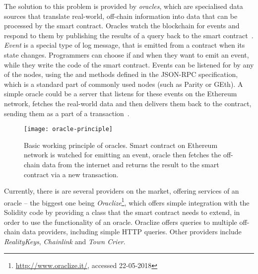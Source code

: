 The solution to this problem is provided by \textit{oracles}, which are specialised data sources that translate real-world, off-chain information into data that can be processed by the smart contract. Oracles watch the blockchain for events and respond to them by publishing the results of a query back to the smart contract~\cite{JohnWeldon2016BuildingContract}. \textit{Event} is a special type of log message, that is emitted from a contract when its state changes. Programmers can choose if and when they want to emit an event, while they write the code of the smart contract. Events can be listened for by any of the nodes, using the  and  methods defined in the JSON-RPC specification\footnotemark, which is a standard part of commonly used nodes (such as Parity or GEth). A simple oracle could be a server that listens for these events on the Ethereum network, fetches the real-world data and then delivers them back to the contract, sending them as a part of a transaction~\cite{JulesDourlens2017Oracles:Blockchain, 2018OraclizeDocumentation}. 
% 
% 
\begin{figure}[ht]
    \centering
    \texttt{[image: oracle-principle]}
    \caption{Basic working principle of oracles. Smart contract on Ethereum network is watched for emitting an event, oracle then fetches the off-chain data from the internet and returns the result to the smart contract via a new transaction.}
    \label{fig:oracles-principle}
\end{figure}

Currently, there is are several providers on the market, offering services of an oracle -- the biggest one being \textit{Oraclize}\footnote{\url{http://www.oraclize.it/}, accessed 22-05-2018}, which offers simple integration with the Solidity code by providing a class that the smart contract needs to extend, in order to use the functionality of an oracle. Oraclize offers queries to multiple off-chain data providers, including simple HTTP queries. Other providers include \textit{RealityKeys}, \textit{Chainlink} and \textit{Town Crier}\footnotemark.
% 
% 

